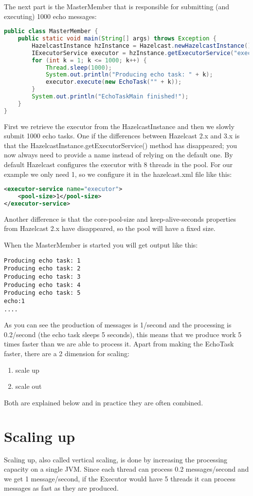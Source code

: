 The next part is the MasterMember that is responsible for submitting (and executing) 1000 echo messages:
\begin{lstlisting}[language=java]
public class MasterMember {
    public static void main(String[] args) throws Exception {
        HazelcastInstance hzInstance = Hazelcast.newHazelcastInstance();
        IExecutorService executor = hzInstance.getExecutorService("executor");
        for (int k = 1; k <= 1000; k++) {
            Thread.sleep(1000);
            System.out.println("Producing echo task: " + k);
            executor.execute(new EchoTask("" + k));
        }
        System.out.println("EchoTaskMain finished!");
    }
}
\end{lstlisting}
First we retrieve the executor from the HazelcastInstance and then we slowly submit 1000 echo tasks. One if the differences between Hazelcast 2.x and 3.x is that the HazelcastInstance.getExecutorService() method has disappeared; you now always need to provide a name instead of relying on the default one. By default Hazelcast configures the executor with 8 threads in the pool. For our example we only need 1, so we configure it in the hazelcast.xml file like this:
\begin{lstlisting}[language=xml]
<executor-service name="executor">
    <pool-size>1</pool-size>
</executor-service>
\end{lstlisting}
Another difference is that the core-pool-size and keep-alive-seconds properties from Hazelcast 2.x have disappeared, so the pool will have a fixed size.

When the MasterMember is started you will get output like this:
\begin{lstlisting}
Producing echo task: 1
Producing echo task: 2
Producing echo task: 3
Producing echo task: 4
Producing echo task: 5
echo:1
....
\end{lstlisting}
As you can see the production of messages is 1/second and the processing is 0.2/second (the echo task sleeps 5 seconds), this means that we produce work 5 times faster than we are able to process it. Apart from making the EchoTask faster, there are a 2 dimension for scaling:
\begin{enumerate}
\item scale up 
\item scale out
\end{enumerate}
Both are explained below and in practice they are often combined. 

\section{Scaling up}
Scaling up, also called vertical scaling, is done by increasing the processing capacity on a single JVM. Since each thread can process 0.2 messages/second and we get 1 message/second, if the Executor would have 5 threads it can process messages as fast as they are produced.

